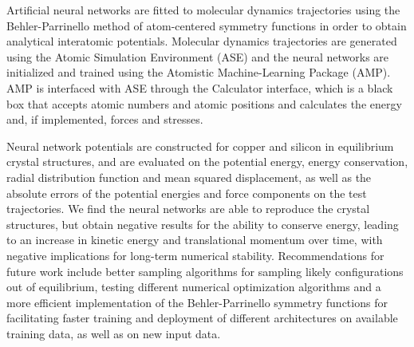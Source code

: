 Artificial neural networks are fitted to molecular dynamics trajectories
using the Behler-Parrinello method of atom-centered symmetry functions
in order to obtain analytical interatomic potentials.
Molecular dynamics trajectories are generated using the Atomic Simulation
Environment (ASE) and the neural networks are initialized and trained
using the Atomistic Machine-Learning Package (AMP). AMP is interfaced
with ASE through the Calculator interface, which is a black box
that accepts atomic numbers and atomic positions and calculates
the energy and, if implemented, forces and stresses.
\par
Neural network potentials are constructed for copper and silicon
in equilibrium crystal structures, and are evaluated on the potential energy,
energy conservation, radial distribution function and mean
squared displacement, as well as the absolute errors of the
potential energies and force components on the test trajectories.
We find the neural networks are able to reproduce the crystal structures,
but obtain negative results for the ability to conserve energy,
leading to an increase in kinetic energy and translational momentum
over time, with negative implications for long-term numerical stability.
Recommendations for future work include better sampling
algorithms for sampling likely configurations out of equilibrium,
testing different numerical optimization algorithms
and a more efficient implementation of the Behler-Parrinello
symmetry functions for facilitating faster training and deployment
of different architectures on available training data, as well as
on new input data.
